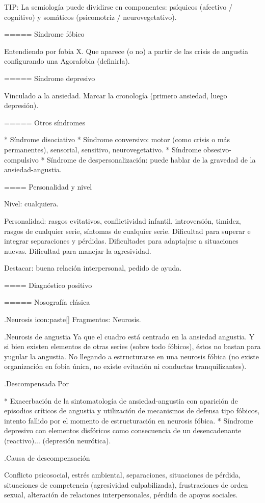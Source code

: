 \documentclass{scrbook}
\begin{document}
TIP: La semiología puede dividirse en componentes: psíquicos (afectivo / cognitivo) y somáticos (psicomotriz / neurovegetativo).

===== Síndrome fóbico

Entendiendo por fobia X. Que aparece (o no) a partir de las crisis de angustia configurando una Agorafobia (definirla).

===== Síndrome depresivo

Vinculado a la ansiedad. Marcar la cronología (primero ansiedad, luego depresión).

===== Otros síndromes

* Síndrome disociativo
* Síndrome conversivo: motor (como crisis o más permanentes), sensorial, sensitivo, neurovegetativo.
* Síndrome obsesivo-compulsivo
* Síndrome de despersonalización: puede hablar de la gravedad de la ansiedad-angustia.

==== Personalidad y nivel

Nivel: cualquiera.

Personalidad: rasgos evitativos, conflictividad infantil, introversión, timidez, rasgos de cualquier serie, síntomas de cualquier serie. Dificultad para superar e integrar separaciones y pérdidas. Dificultades para adapta|rse a situaciones nuevas. Dificultad para manejar la agresividad.

Destacar: buena relación interpersonal, pedido de ayuda.

==== Diagnóstico positivo

===== Nosografía clásica

.Neurosis
icon:paste[] Fragmentos: Neurosis.

.Neurosis de angustia
Ya que el cuadro está centrado en la ansiedad angustia. Y si bien existen elementos de otras series (sobre todo fóbicos), éstos no bastan para yugular la angustia. No llegando a estructurarse en una neurosis fóbica (no existe organización en fobia única, no existe evitación ni conductas tranquilizantes).

.Descompensada
Por

* Exacerbación de la sintomatología de ansiedad-angustia con aparición de episodios críticos de angustia y utilización de mecanismos de defensa tipo fóbicos, intento fallido por el momento de estructuración en neurosis fóbica.
* Síndrome depresivo con elementos disfóricos como consecuencia de un desencadenante (reactivo)... (depresión neurótica).

.Causa de descompensación

Conflicto psicosocial, estrés ambiental, separaciones, situaciones de pérdida, situaciones de competencia (agresividad culpabilizada), frustraciones de orden sexual, alteración de relaciones interpersonales, pérdida de apoyos sociales.
\end{document}
